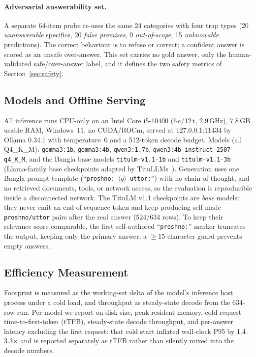 \documentclass[conference]{IEEEtran}
\begin{document}
\paragraph{Adversarial answerability set.}
A separate 64-item probe re-uses the same 24 categories with four trap types (20 \emph{unanswerable} specifics, 20 \emph{false premises}, 9 \emph{out-of-scope}, 15 \emph{unknowable} predictions). The correct behaviour is to refuse or correct; a confident answer is scored as an unsafe over-answer. This set carries no gold answer, only the human-validated safe/over-answer label, and it defines the two safety metrics of Section~\ref{sec:safety}.

\subsection{Models and Offline Serving}
All inference runs CPU-only on an Intel Core i5-10400 (6\,c/12\,t, 2.9\,GHz), 7.8\,GB usable RAM, Windows~11,
no CUDA/ROCm, served at 127.0.0.1:11434 by Ollama 0.34.1 with temperature~0 and a 512-token decode budget. Models
(all Q4\_K\_M): \texttt{gemma3:1b}, \texttt{gemma3:4b}, \texttt{qwen3:1.7b},
\texttt{qwen3:4b-instruct-2507-q4\_K\_M}, and the Bangla base models \texttt{titulm-v1.1-1b} and
\texttt{titulm-v1.1-3b} (Llama-family base checkpoints adapted by TituLLMs~\cite{titullm}). Generation uses one Bangla prompt
template (``\texttt{proshno:}\ $\langle q\rangle$\ \texttt{uttor:}'') with no chain-of-thought, and no retrieved documents,
tools, or network access, so the evaluation is reproducible inside a disconnected network. The TituLM v1.1 checkpoints are \emph{base} models: they never emit an
end-of-sequence token and keep producing self-made \texttt{proshno/uttor} pairs after the real answer
(524/634 rows). To keep their relevance score comparable, the first self-authored
``\texttt{proshno:}'' marker truncates the output, keeping only the primary answer; a $\geq$15-character guard
prevents empty answers.

\subsection{Efficiency Measurement}
Footprint is measured as the working-set delta of the model's inference host process under a cold load, and
throughput as steady-state decode from the 634-row run. Per model we report on-disk size, peak resident memory,
cold-request time-to-first-token (tTFB), steady-state decode throughput, and per-answer latency excluding the
first request: that cold start inflated wall-clock P95 by 1.4--3.3$\times$ and is reported separately as tTFB
rather than silently mixed into the decode numbers.
\end{document}
